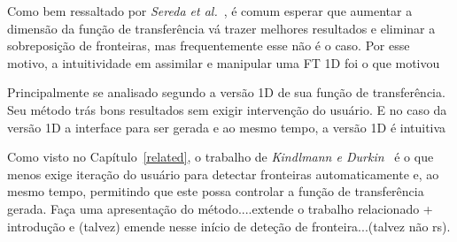     Como bem ressaltado por \textit{Sereda et al.}~\cite{sereda1}, é comum esperar que aumentar a dimensão da função de transferência vá trazer melhores resultados e eliminar a sobreposição de fronteiras, mas frequentemente esse não é o caso. Por esse motivo, a intuitividade em assimilar e manipular uma FT 1D foi o que motivou
    
    
    Principalmente se analisado segundo a versão 1D de sua função de transferência. Seu método trás bons resultados sem exigir intervenção do usuário. E no caso da versão 1D a interface para ser gerada e ao mesmo tempo, a versão 1D é intuitiva
    
    
    Como visto no Capítulo~\ref{related}, o trabalho de \textit{Kindlmann e Durkin}~\cite{gordon} é o que menos exige iteração do usuário para detectar fronteiras automaticamente e, ao mesmo tempo, permitindo que este possa controlar a função de transferência gerada.
    Faça uma apresentação do método....extende o trabalho relacionado + introdução e (talvez) emende nesse início de deteção de fronteira...(talvez não rs).